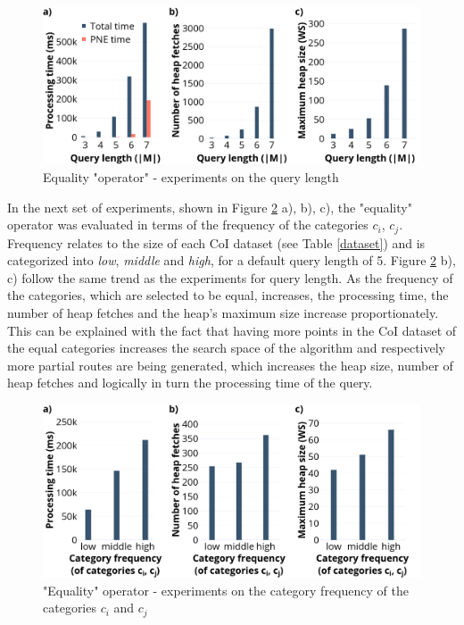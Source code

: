 \begin{figure}[H]
	\includegraphics[scale=0.33]{images/eo_length_30.png}
	\centering
	\caption{Equality "operator" - experiments on the query length}
	\label{fig:eo_length}
\end{figure}

In the next set of experiments, shown in Figure \ref{fig:eo_frequency} a), b), c), the "equality" operator was evaluated in terms of the frequency of the categories $c_i$, $c_j$. Frequency relates to the size of each CoI dataset (see Table \ref{dataset}) and is categorized into \textit{low}, \textit{middle} and \textit{high}, for a default query length of 5.  Figure \ref{fig:eo_frequency} b), c) follow the same trend as the experiments for query length. 
As the frequency of the categories, which are selected to be equal, increases, the processing time, the number of heap fetches and the heap's maximum size increase proportionately. This can be explained with the fact that having more points in the CoI dataset of the equal categories increases the search space of the algorithm and respectively more partial routes are being generated, which increases the heap size, number of heap fetches and logically in turn the processing time of the query.

\begin{figure}[h!]
	\includegraphics[scale=0.33]{images/eo_frequency_30.png}
	\centering
	\caption{"Equality" operator - experiments on the category frequency of the categories $c_i$ and $c_j$}
	\label{fig:eo_frequency}
\end{figure}

